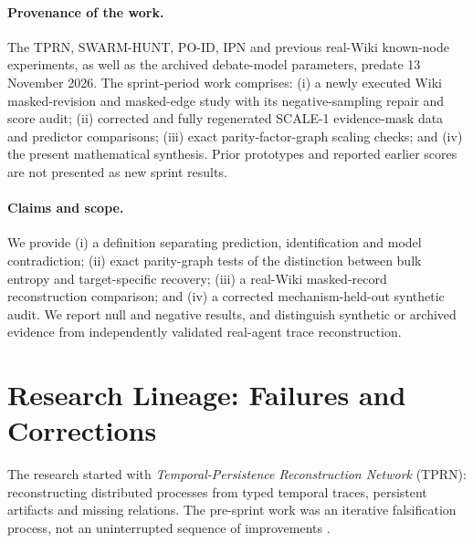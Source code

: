 \documentclass[10pt,twocolumn]{article}
\begin{document}
\paragraph{Provenance of the work.} The TPRN, SWARM-HUNT, PO-ID, IPN and previous real-Wiki known-node experiments, as well as the archived debate-model parameters, predate 13 November 2026. The sprint-period work comprises: (i) a newly executed Wiki masked-revision and masked-edge study with its negative-sampling repair and score audit; (ii) corrected and fully regenerated SCALE-1 evidence-mask data and predictor comparisons; (iii) exact parity-factor-graph scaling checks; and (iv) the present mathematical synthesis. Prior prototypes and reported earlier scores are not presented as new sprint results.

\paragraph{Claims and scope.} We provide (i) a definition separating prediction, identification and model contradiction; (ii) exact parity-graph tests of the distinction between bulk entropy and target-specific recovery; (iii) a real-Wiki masked-record reconstruction comparison; and (iv) a corrected mechanism-held-out synthetic audit. We report null and negative results, and distinguish synthetic or archived evidence from independently validated real-agent trace reconstruction.


\section{Research Lineage: Failures and Corrections}
The research started with \emph{Temporal-Persistence Reconstruction Network} (TPRN): reconstructing distributed processes from typed temporal traces, persistent artifacts and missing relations. The pre-sprint work was an iterative falsification process, not an uninterrupted sequence of improvements \cite{mariappan2026tprn,mariappan2026provenance}.
\end{document}
